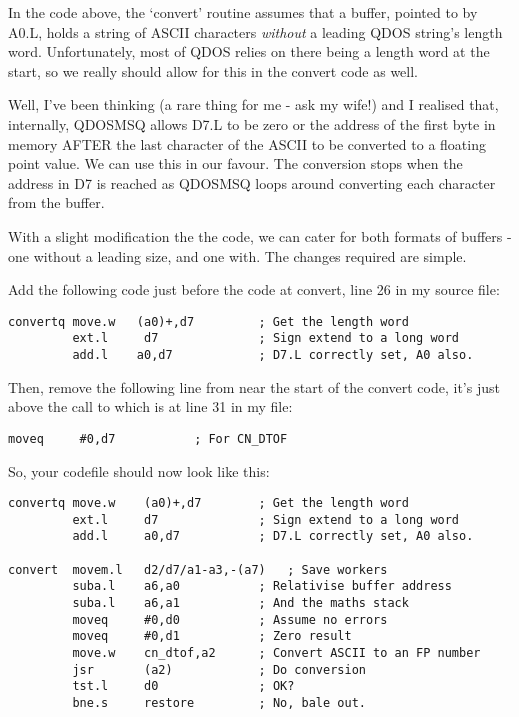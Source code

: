 In the code above, the `convert' routine assumes that a buffer, pointed
to by A0.L, holds a string of ASCII characters \emph{without} a leading QDOS
string's length word. Unfortunately, most of QDOS relies on there being a length word at
the start, so we really should allow for this in the convert code as well.

Well, I've been thinking (a rare thing for me -{} ask my wife!) and I realised
that, internally, QDOSMSQ allows D7.L to be zero or the address of the first
byte in memory AFTER the last character of the ASCII to be converted to a
floating point value. We can use this in our favour. The conversion stops when
the address in D7 is reached as QDOSMSQ loops around converting each character
from the buffer.

With a slight modification the the code, we can cater for both formats of
buffers -{} one without a leading size, and one with. The changes required are
simple.

Add the following code just before the code at convert, line 26 in my source file:

\begin{lstlisting}[firstnumber=26,caption={Better ASCII to LONG Converter - Converq}]
convertq move.w   (a0)+,d7         ; Get the length word
         ext.l     d7              ; Sign extend to a long word
         add.l    a0,d7            ; D7.L correctly set, A0 also.
\end{lstlisting}

Then, remove the following line from near the start of the convert code, it's
just above the call to  which is at line 31 in my file:

\begin{lstlisting}[firstnumber=31,]
         moveq     #0,d7           ; For CN_DTOF
\end{lstlisting}

So, your codefile should now look like this:

\begin{lstlisting}[firstnumber=26,caption={Better ASCII to LONG Converter - Part 1}]
convertq move.w    (a0)+,d7        ; Get the length word
         ext.l     d7              ; Sign extend to a long word
         add.l     a0,d7           ; D7.L correctly set, A0 also.

convert  movem.l   d2/d7/a1-a3,-(a7)   ; Save workers
         suba.l    a6,a0           ; Relativise buffer address
         suba.l    a6,a1           ; And the maths stack
         moveq     #0,d0           ; Assume no errors
         moveq     #0,d1           ; Zero result
         move.w    cn_dtof,a2      ; Convert ASCII to an FP number
         jsr       (a2)            ; Do conversion
         tst.l     d0              ; OK?
         bne.s     restore         ; No, bale out.
\end{lstlisting}

